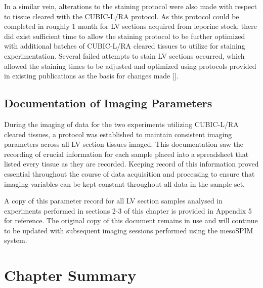 In a similar vein, alterations to the staining protocol were also made with respect to tissue cleared with the CUBIC-L/RA protocol. As this protocol could be completed in roughly 1 month for LV sections acquired from leporine stock, there did exist sufficient time to allow the staining protocol to be further optimized with additional batches of CUBIC-L/RA cleared tissues to utilize for staining experimentation. Several failed attempts to stain LV sections occurred, which allowed the staining times to be adjusted and optimized using protocols provided in existing publications as the basis for changes made [].   

\subsection{Documentation of Imaging Parameters}

During the imaging of data for the two experiments utilizing CUBIC-L/RA cleared tissues, a protocol was established to maintain consistent imaging parameters across all LV section tissues imaged. This documentation saw the recording of crucial information for each sample placed into a spreadsheet that listed every tissue as they are recorded. Keeping record of this information proved essential throughout the course of data acquisition and processing to ensure that imaging variables can be kept constant throughout all data in the sample set. 

A copy of this parameter record for all LV section samples analysed in experiments performed in sections 2-3 of this chapter is provided in Appendix 5 for reference. The original copy of this document remains in use and will continue to be updated with subsequent imaging sessions performed using the mesoSPIM system.


\section{Chapter Summary}

